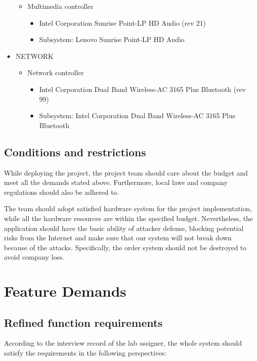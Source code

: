 \documentclass[a4paper]{report}
\begin{document}
\begin{itemize}
\begin{itemize}
\item Multimedia controller
\begin{itemize}
\item Intel Corporation Sunrise Point-LP HD Audio (rev 21)
\item Subsystem: Lenovo Sunrise Point-LP HD Audio
\end{itemize}
\end{itemize}
\item NETWORK
\begin{itemize}
\item Network controller
\begin{itemize}
\item Intel Corporation Dual Band Wireless-AC 3165 Plus Bluetooth (rev 99)
\item Subsystem: Intel Corporation Dual Band Wireless-AC 3165 Plus Bluetooth
\end{itemize}
\end{itemize}
\end{itemize}
\section{Conditions and restrictions}
While deploying the project, the project team should care about the budget and meet all the demands stated above. Furthermore, local laws and company regulations should also be adhered to.
\par
The team should adopt satisfied hardware system for the project implementation, while all  the hardware resources are within the specified budget. Nevertheless, the application should have the basic ability of attacker defense, blocking potential risks from the Internet and make sure that our system will not break down because of the attacks. Specifically, the order system should not be destroyed to avoid company loss.
\chapter{Feature Demands}

\section{Refined function requirements}
According to the interview record of the lab assigner, the whole system should satisfy the requirements in the following perspectives:
\end{document}
